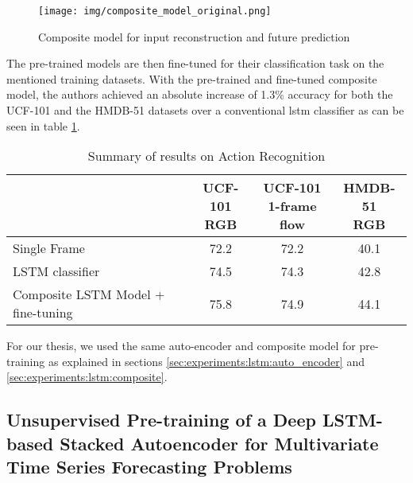 \begin{figure}[h]
	\centering
	\texttt{[image: img/composite\_model\_original.png]}
	\caption{Composite model for input reconstruction and future prediction \cite{unsupervised_learning_lstms}}
	\label{fig:stateofart:unsupervised_lstm_composite}
\end{figure}

The pre-trained models are then fine-tuned for their classification task on the mentioned training datasets. With the pre-trained and fine-tuned composite model, the authors achieved an absolute increase of 1.3\% accuracy for both the UCF-101 and the HMDB-51 datasets over a conventional \gls{lstm} classifier as can be seen in table \ref{table:stateofart:unsupervised_learning_results}.

\begin{table}[]
	\centering
	\begin{tabular}{l c c c}
		\thead{Model} & \thead{UCF-101 \\ RGB} & \thead{UCF-101
\\ 1-frame flow} & \thead{HMDB-51 \\
RGB} \\ \hline
		\midrule
		Single Frame & 72.2 & 72.2 & 40.1 \\
		\midrule
		LSTM classifier & 74.5 & 74.3 & 42.8 \\
		\midrule
		Composite LSTM
Model + fine-tuning & 75.8 & 74.9 & 44.1 \\
	\end{tabular}
	\caption{Summary of results on Action Recognition \cite{unsupervised_learning_lstms}}
	\label{table:stateofart:unsupervised_learning_results}
\end{table}

For our thesis, we used the same auto-encoder and composite model for pre-training as explained in sections \ref{sec:experiments:lstm:auto_encoder} and \ref{sec:experiments:lstm:composite}.

\subsection{Unsupervised Pre-training of a Deep LSTM-based Stacked Autoencoder for Multivariate Time Series Forecasting Problems} \label{sec:stateofart:unsupervised_learning_lstms_timeseries}

